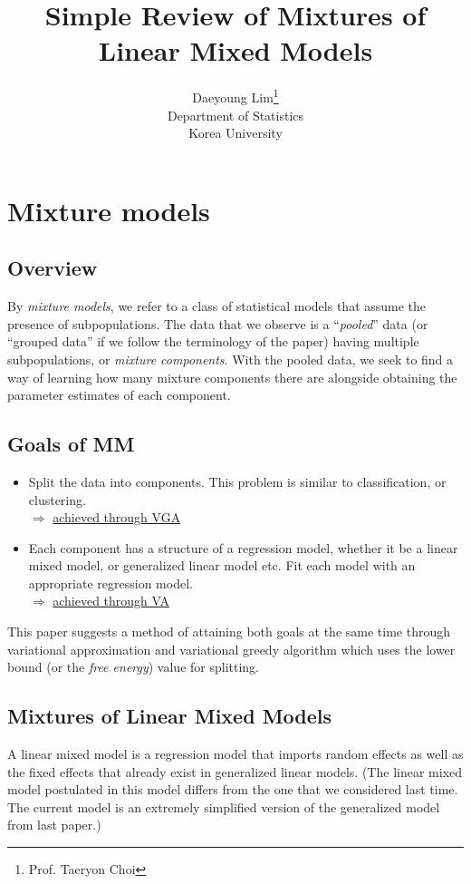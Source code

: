 \documentclass[11pt]{article}
\begin{document}
\nocite{*}

\title{Simple Review of Mixtures of Linear Mixed Models}

\author{Daeyoung Lim\thanks{Prof. Taeryon Choi} \\
Department of Statistics \\
Korea University}

\maketitle

\section{Mixture models}
\subsection{Overview}
By \emph{mixture models}, we refer to a class of statistical models that assume the presence of subpopulations. The data that we observe is a ``\emph{pooled}'' data (or ``grouped data'' if we  follow the terminology of the paper) having multiple subpopulations, or \emph{mixture components}. With the pooled data, we seek to find a way of learning how many mixture components there are alongside obtaining the parameter estimates of each component.

\subsection{Goals of MM}
\begin{itemize}
  \item Split the data into components. This problem is similar to classification, or clustering. \\ $\Rightarrow$ \underline{achieved through VGA}
  \item Each component has a structure of a regression model, whether it be a linear mixed model, or generalized linear model etc. Fit each model with an appropriate regression model.\\ $\Rightarrow$ \underline{achieved through VA}
\end{itemize}

This paper suggests a method of attaining both goals at the same time through variational approximation and variational greedy algorithm which uses the lower bound (or the \emph{free energy}) value for splitting.

\subsection{Mixtures of Linear Mixed Models}
A linear mixed model is a regression model that imports random effects as well as the fixed effects that already exist in generalized linear models. (The linear mixed model postulated in this model differs from the one that we considered last time. The current model is an extremely simplified version of the generalized model from last paper.)
\end{document}
